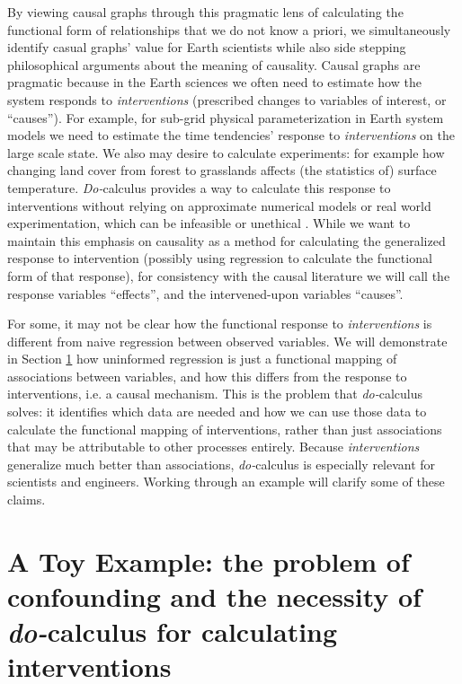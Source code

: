 \documentclass[12pt]{article}
\begin{document}
By viewing causal graphs through this pragmatic lens of calculating
the functional form of relationships that we do not know a priori, we
simultaneously identify casual graphs' value for Earth scientists
while also side stepping philosophical arguments about the meaning of
causality. Causal graphs are pragmatic because in the Earth sciences
we often need to estimate how the system responds to
\emph{interventions} (prescribed changes to variables of interest, or
``causes''). For example, for sub-grid physical parameterization in Earth system models we need to
estimate the time tendencies' response to \emph{interventions} on the
large scale state. We also may desire to calculate experiments: for
example how changing land cover from forest to grasslands affects (the
statistics of) surface temperature. \textit{Do-}calculus provides a
way to calculate this response to interventions without relying on
approximate numerical models or real world experimentation, which can
be infeasible or unethical \citep[as is the case for geoengineering;
e.g., unilateral decisions to seed the oceans with iron, or spray
aerosols in the atmosphere,][]{hamilton2013no}. While we want to
maintain this emphasis on causality as a method for calculating the
generalized response to intervention (possibly using regression to
calculate the functional form of that response), for consistency with
the causal literature we will call the response variables ``effects'',
and the intervened-upon variables ``causes''.

For some, it may not be clear how the functional response to
\emph{interventions} is different from naive regression between
observed variables. We will demonstrate in Section
\ref{sec:causal-graphs-pearls} how uninformed regression is just a
functional mapping of associations between variables, and how this
differs from the response to interventions, i.e. a causal mechanism. This is the problem that
\textit{do-}calculus solves: it identifies which data are needed and
how we can use those data to calculate the functional mapping of
interventions, rather than just associations that may be attributable
to other processes entirely. Because \emph{interventions} generalize
much better than associations, \textit{do-}calculus is especially
relevant for scientists and engineers. Working through an example will
clarify some of these claims.

\section{A Toy Example: the problem of confounding and the necessity
  of \textit{do-}calculus for calculating interventions}
\label{sec:causal-graphs-pearls}
\end{document}
